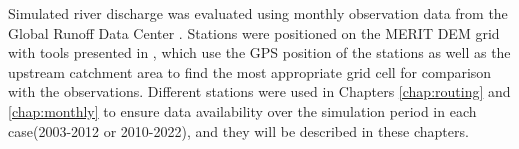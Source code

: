 Simulated river discharge was evaluated using monthly observation data from the Global Runoff Data Center \citep[GRDC, https://grdc.bafg.de,][]{fekete_global_2003}.
Stations were positioned on the MERIT DEM grid with tools presented in \cite{polcher_hydrological_2023}, which use the GPS position of the stations as well as the upstream catchment area to find the most appropriate grid cell for comparison with the observations. 
Different stations were used in Chapters \ref{chap:routing} and \ref{chap:monthly} to ensure data availability over the simulation period in each case(2003-2012 or 2010-2022), and they will be described in these chapters.

\begin{table}[h]
    \caption{Datasets used for evaluation.}
    \label{tab:obs-datasets}
\end{table}

